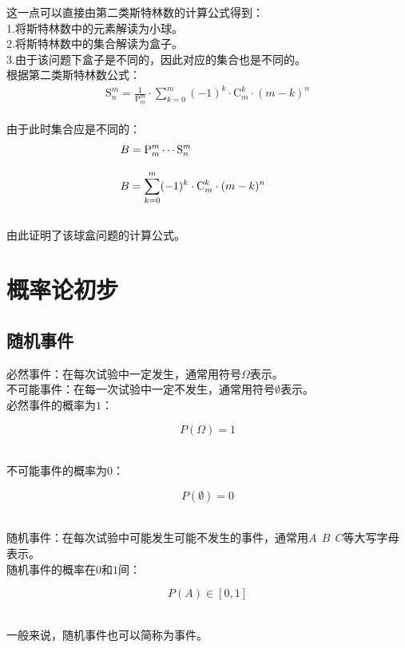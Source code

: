 \documentclass[UTF8]{ctexart}
\newcommand{\Pe}{\mathrm{P}}
\newcommand{\Co}{\mathrm{C}}
\newcommand{\St}{\mathrm{S}}
\begin{document}
    这一点可以直接由第二类斯特林数的计算公式得到：\\[3mm]
    1.将斯特林数中的元素解读为小球。\\[3mm]
    2.将斯特林数中的集合解读为盒子。\\[3mm]
    3.由于该问题下盒子是不同的，因此对应的集合也是不同的。\\[8mm]
    根据第二类斯特林数公式：
    \begin{align}
        \St_n^m=\frac{1}{\Pe_m^m}\cdot\sum_{k=0}^{m}(-1)^k\cdot\Co_m^k\cdot(m-k)^n
    \end{align}\\
    由于此时集合应是不同的：
    \begin{align}
        &B=\Pe_m^m\cdots\St_n^m\\[3mm]
        &B=\sum_{k=0}^{m}(-1)^k\cdot\Co_m^k\cdot(m-k)^n~~\hphantom{\frac{1}{\Pe_n^m}\cdot}
    \end{align}\\
    由此证明了该球盒问题的计算公式。

\newpage

\section{概率论初步}
    
\subsection{随机事件}
    必然事件：在每次试验中一定发生，通常用符号$\Omega$表示。\\[3mm]
    不可能事件：在每一次试验中一定不发生，通常用符号$\emptyset$表示。\\[3mm]
    必然事件的概率为$1$：
    \begin{large}
        \begin{equation*}
            P(\Omega)=1
        \end{equation*}
    \end{large}\\
    不可能事件的概率为$0$：
    \begin{large}
        \begin{equation*}
            P(\emptyset)=0
        \end{equation*}
    \end{large}\\[1mm]
    随机事件：在每次试验中可能发生可能不发生的事件，通常用$A~~B~~C$等大写字母表示。\\[3mm]
    随机事件的概率在$0$和$1$间：
    \begin{large}
        \begin{equation*}
            P(A)\in[0,1]
        \end{equation*}
    \end{large}\\
    一般来说，随机事件也可以简称为事件。
\end{document}

